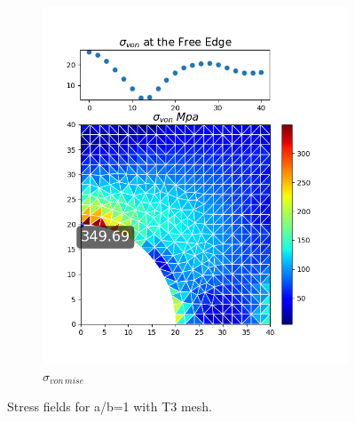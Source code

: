 \documentclass[twoside,twocolumn,10pt]{article}
\begin{document}
\begin{figure}[!ht]
\begin{subfigure}[c]{0.26\textwidth}
    \includegraphics[width=1.\linewidth]{Q2_5/Q5_1_von_triangle.png}
    \caption{$\sigma_{von \, mise}$}
    \label{fig:von_tri_1}
  \end{subfigure}
  \caption{Stress fields for a/b=1 with T3 mesh.}
  \label{fig:tri_1}
\end{figure}
\end{document}
